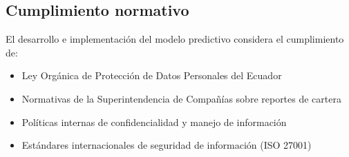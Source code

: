 \subsection{Cumplimiento normativo}
El desarrollo e implementación del modelo predictivo considera el cumplimiento de:

\begin{itemize}
    \item Ley Orgánica de Protección de Datos Personales del Ecuador
    \item Normativas de la Superintendencia de Compañías sobre reportes de cartera
    \item Políticas internas de confidencialidad y manejo de información
    \item Estándares internacionales de seguridad de información (ISO 27001)
\end{itemize}
